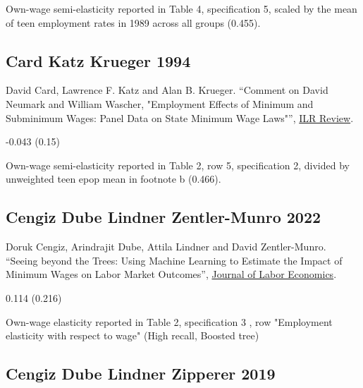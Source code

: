  Own-wage semi-elasticity reported in Table 4, specification 5, scaled by the mean of teen employment rates in 1989 across all groups (0.455).

\subsection*{Card Katz Krueger 1994}
\vspace{-0.7em}

\noindent David Card, Lawrence F. Katz and Alan B. Krueger. ``Comment on David Neumark and William Wascher, "Employment Effects of Minimum and Subminimum Wages: Panel Data on State Minimum Wage Laws"'', \href{https://doi.org/10.1177/001979399404700308}{ILR Review}.

\vspace{0.7em}

 -0.043 (0.15)

\vspace{0.7em}

 Own-wage semi-elasticity reported in Table 2, row 5, specification 2, divided by unweighted teen epop mean in footnote b (0.466).

\subsection*{Cengiz Dube Lindner Zentler-Munro 2022}
\vspace{-0.7em}

\noindent Doruk Cengiz, Arindrajit Dube, Attila Lindner and David Zentler-Munro. ``Seeing beyond the Trees: Using Machine Learning to Estimate the Impact of Minimum Wages on Labor Market Outcomes'', \href{https://doi.org/10.1086/718497}{Journal of Labor Economics}.

\vspace{0.7em}

 0.114 (0.216)

\vspace{0.7em}

 Own-wage elasticity reported in Table 2, specification 3 , row "Employment elasticity with respect to wage" (High recall, Boosted tree)

\subsection*{Cengiz Dube Lindner Zipperer 2019}
\vspace{-0.7em}

